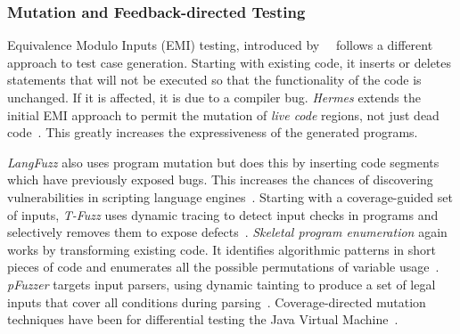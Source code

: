 \subsubsection{Mutation and Feedback-directed Testing}

Equivalence Modulo Inputs (EMI) testing, introduced by~\citeauthor{Le2013a}~\cite{Le2013a} follows a different approach to test case generation. Starting with existing code, it inserts or deletes statements that will not be executed so that the functionality of the code is unchanged. If it is affected, it is due to a compiler bug. \emph{Hermes} extends the initial EMI approach to permit the mutation of \emph{live code} regions, not just dead code~\cite{Sun2016a}. This greatly increases the expressiveness of the generated programs.

\emph{LangFuzz} also uses program mutation but does this by inserting code segments which have previously exposed bugs. This increases the chances of discovering vulnerabilities in scripting language engines~\cite{Holler2012}.
Starting with a coverage-guided set of inputs, \emph{T-Fuzz} uses dynamic tracing to detect input checks in programs and selectively removes them to expose defects~\cite{Peng2018}.
\emph{Skeletal program enumeration} again works by transforming existing code. It identifies algorithmic patterns in short pieces of code and enumerates all the possible permutations of variable usage~\cite{Zhang2017a}.
\emph{pFuzzer} targets input parsers, using dynamic tainting to produce a set of legal inputs that cover all conditions during parsing~\cite{Mathis2019}.
Coverage-directed mutation techniques have been for differential testing the Java Virtual Machine~\cite{Chen2016b}.

